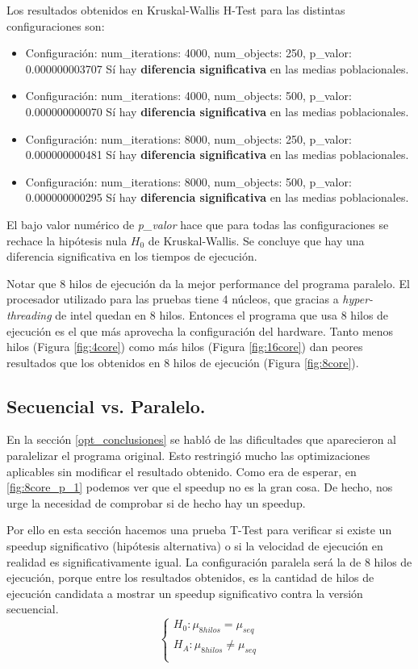\documentclass{article}
\begin{document}
Los resultados obtenidos en Kruskal-Wallis H-Test para las distintas configuraciones son:
\begin{itemize}
\item Configuración: num\_iterations: 4000, num\_objects: 250, p\_valor: 0.000000003707
	Sí hay \textbf{diferencia significativa} en las medias poblacionales.

\item Configuración: num\_iterations: 4000, num\_objects: 500, p\_valor: 0.000000000070
	Sí hay \textbf{diferencia significativa} en las medias poblacionales.

\item Configuración: num\_iterations: 8000, num\_objects: 250, p\_valor: 0.000000000481
	Sí hay \textbf{diferencia significativa} en las medias poblacionales.

\item Configuración: num\_iterations: 8000, num\_objects: 500, p\_valor: 0.000000000295
	Sí hay \textbf{diferencia significativa} en las medias poblacionales.
\end{itemize}
El bajo valor numérico de \textit{p\_valor} hace que para todas las configuraciones se rechace
la hipótesis nula ${H_0}$ de Kruskal-Wallis. Se concluye que hay una diferencia significativa
en los tiempos de ejecución.

Notar que 8 hilos de ejecución da la mejor performance del programa paralelo. El procesador
utilizado para las pruebas tiene 4 núcleos, que gracias a \textit{hyper-threading} de intel quedan en 8 hilos.
Entonces el programa que usa 8 hilos de ejecución es el que más aprovecha la configuración del hardware.
Tanto menos hilos (Figura \ref{fig:4core}) como más hilos (Figura \ref{fig:16core}) dan peores
resultados que los obtenidos en 8 hilos de ejecución (Figura \ref{fig:8core}).


\subsection{Secuencial vs. Paralelo.\label{t-test}}
En la sección \ref{opt_conclusiones} se habló de las dificultades que aparecieron al paralelizar el programa
original. Esto restringió mucho las optimizaciones aplicables sin modificar el resultado obtenido.
Como era de esperar, en \ref{fig:8core_p_1} podemos ver que el speedup no es la gran cosa. De hecho, nos urge
la necesidad de comprobar si de hecho hay un speedup.

Por ello en esta sección hacemos una prueba T-Test para
verificar si existe un speedup significativo (hipótesis alternativa) o si la velocidad de ejecución en realidad
es significativamente igual. La configuración paralela será la de 8 hilos de ejecución, porque entre los resultados
obtenidos, es la cantidad de hilos de ejecución candidata a mostrar un speedup significativo contra la versión secuencial.
\begin{displaymath}
\begin{cases}
	{H_0}: \mu_{8hilos} = \mu_{seq}\\
	{H_A}: \mu_{8hilos} \neq \mu_{seq}\\
\end{cases}
\end{displaymath}
\end{document}
